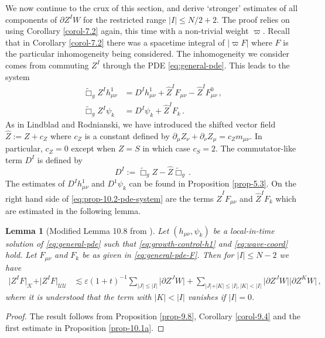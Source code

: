\documentclass[11pt, a4paper]{amsart}
\numberwithin{equation}{section}
\newtheorem{lemma}[theorem]{Lemma}
\numberwithin{theorem}{section}
\newcommand{\p}{\partial}
\newcommand{\mn}{{\mu \nu}}
\newcommand{\tbox}{\widetilde{\Box}}
\newcommand{\UU}{{\mathcal{U} \mathcal{U}}}
\newcommand{\K}{\mathcal{K}}
\newcommand{\I}{\vert I \vert}
\begin{document}
We now continue to the crux of this section, and derive `stronger' estimates of all components of $\p Z^I W$ for the restricted range $\I \leq N/2 + 2$. The proof relies on using Corollary \ref{corol-7.2} again, this time with a non-trivial weight $\varpi$. Recall that in Corollary \ref{corol-7.2} there was a spacetime integral of $ \vert \varpi F \vert$ where $F$ is the particular inhomogeneity being considered. 
The inhomogeneity we consider comes from commuting $Z^I$ through the PDE \eqref{eq:general-pde}. This leads to the system
\begin{equation} \begin{split}
\tbox_g Z^I h^1_\mn &= D^I h^1_\mn + \hat{Z}^I F_\mn - \hat{Z}^I F^0_\mn  \,, \\
\tbox_g Z^I \psi_k &= D^I \psi_k + \hat{Z}^I F_k \,.
\end{split} \label{eq:prop-10.2-pde-system}
\end{equation}
As in Lindblad and Rodnianski, we have introduced the shifted vector field $\hat{Z} := Z + c_Z$ where $c_Z$ is a constant defined by $\p_\mu Z_\nu + \p_\nu Z_\mu = c_Z m_\mn$. In particular, $c_Z = 0$ except when $Z = S$ in which case $c_S = 2$. The commutator-like term $D^I$ is defined by $$ D^I := \tbox_g Z - \hat{Z} \tbox_g \,. $$
The estimates of $D^I h^1_\mn$ and $D^1 \psi_k$ can be found in Proposition \ref{prop-5.3}. On the right hand side of \eqref{eq:prop-10.2-pde-system} are the terms $\hat{Z}^I F_\mn$ and $\hat{Z}^I F_k$ which are estimated in the following lemma. 

\begin{lemma}[Modified Lemma 10.8 from \cite{LR:04}] \label{lemma-10.8} Let $(h_\mn, \psi_k)$ be a local-in-time solution of \eqref{eq:general-pde} such that \eqref{eq:growth-control-h1} and \eqref{eq:wave-coord} hold. Let $F_\mn$ and $F_k$ be as given in \eqref{eq:general-pde-F}. Then for $\I \leq N-2$ we have
\begin{align*}
\vert Z^I F \vert_\K + \vert Z^I F \vert_\UU & \lesssim  \varepsilon (1+t)^{-1}\sum_{\vert J \vert \leq \vert I \vert} \vert \p Z^J W \vert +  \sum_{\vert J \vert + \vert K \vert \leq \vert I \vert, \vert K \vert < \vert I \vert} \vert \p Z^J W \vert \vert \p Z^K W \vert  \,,
\end{align*}
where it is understood that the term with $|K| < \I$ vanishes if $\I = 0$. 
\end{lemma}

\begin{proof}
The result follows from Proposition \ref{prop-9.8}, Corollary \ref{corol-9.4} and the first estimate in Proposition \ref{prop-10.1a}.
\end{proof}
\end{document}
